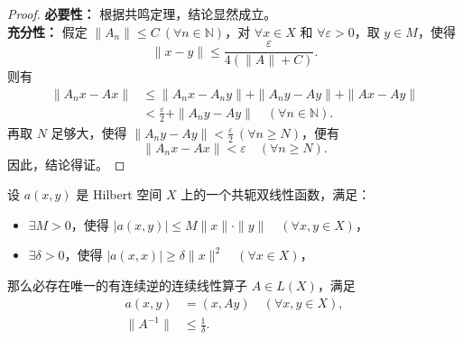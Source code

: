 \documentclass[lang=cn,newtx,10pt,scheme=chinese,thmcnt=chapter]{elegantbook}
\begin{document}
\begin{proof}
\textbf{必要性：} 根据共鸣定理，结论显然成立。\\
\textbf{充分性：} 假定 $\left\|A_n\right\| \leqslant C \ (\forall n \in \mathbb{N})$，对 $\forall x \in X$ 和 $\forall \varepsilon > 0$，取 $y \in M$，使得
\[
\|x - y\| \leqslant \frac{\varepsilon}{4(\|A\| + C)}.
\]
则有
\[
\begin{aligned}
\|A_n x - A x\| &\leqslant \|A_n x - A_n y\| + \|A_n y - A y\| + \|A x - A y\| \\
&< \frac{\varepsilon}{2} + \|A_n y - A y\| \quad (\forall n \in \mathbb{N}).
\end{aligned}
\]
再取 $N$ 足够大，使得 $\|A_n y - A y\| < \frac{\varepsilon}{2} \ (\forall n \geqslant N)$，便有
\[
\|A_n x - A x\| < \varepsilon \quad (\forall n \geqslant N).
\]
因此，结论得证。
\end{proof}


\begin{theorem}
设 $a(x, y)$ 是 Hilbert 空间 $X$ 上的一个共轭双线性函数，满足：
\begin{itemize}
    \item[(1)] $\exists M > 0$，使得 $|a(x, y)| \leqslant M \|x\| \cdot \|y\| \quad (\forall x, y \in X)$，
    \item[(2)] $\exists \delta > 0$，使得 $|a(x, x)| \geqslant \delta \|x\|^2 \quad (\forall x \in X)$，
\end{itemize}
那么必存在唯一的有连续逆的连续线性算子 $A \in L(X)$，满足
\[
\begin{aligned}
a(x, y) &= (x, A y) \quad (\forall x, y \in X), \\
\|A^{-1}\| &\leqslant \frac{1}{\delta}.
\end{aligned}
\]
\end{theorem}
\end{document}
